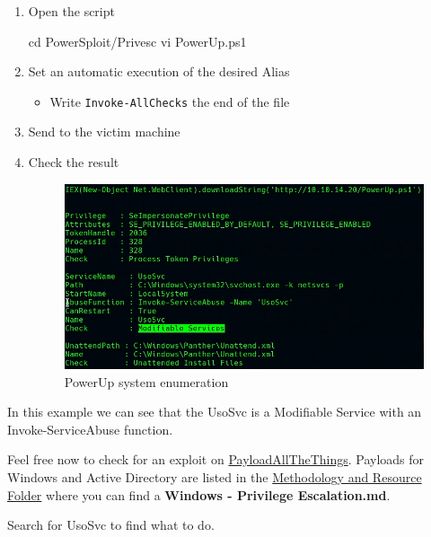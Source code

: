 \documentclass{assets/ipesethesis}
\newenvironment{Shaded}{\begin{snugshade}}{\end{snugshade}}
\newcommand{\BuiltInTok}[1]{#1}
\newcommand{\ExtensionTok}[1]{#1}
\newcommand{\NormalTok}[1]{#1}
\providecommand{\tightlist}{%
  \setlength{\itemsep}{0pt}\setlength{\parskip}{0pt}}
\begin{document}
\begin{enumerate}
\def\labelenumi{\arabic{enumi}.}
\item
  Open the script

\begin{Shaded}
\begin{Highlighting}[]
\BuiltInTok{cd}\NormalTok{ PowerSploit/Privesc}
\ExtensionTok{vi}\NormalTok{ PowerUp.ps1}
\end{Highlighting}
\end{Shaded}
\item
  Set an automatic execution of the desired Alias

  \begin{itemize}
  \tightlist
  \item
    Write \texttt{Invoke-AllChecks} the end of the file
  \end{itemize}
\item
  Send to the victim machine
\item
  Check the result

  \begin{figure}
   \includegraphics[width=0.9\linewidth]{images/sys-enum-powerup} \caption{PowerUp system enumeration}\label{fig:unnamed-chunk-18}
   \end{figure}
\end{enumerate}

In this example we can see that the UsoSvc is a Modifiable Service with an Invoke-ServiceAbuse function.

Feel free now to check for an exploit on \href{https://github.com/swisskyrepo/PayloadsAllTheThings}{PayloadAllTheThings}.
Payloads for Windows and Active Directory are listed in the \href{https://github.com/swisskyrepo/PayloadsAllTheThings/tree/master/Methodology\%20and\%20Resources}{Methodology and Resource Folder}
where you can find a \textbf{Windows - Privilege Escalation.md}.

Search for UsoSvc to find what to do.


\end{document}
